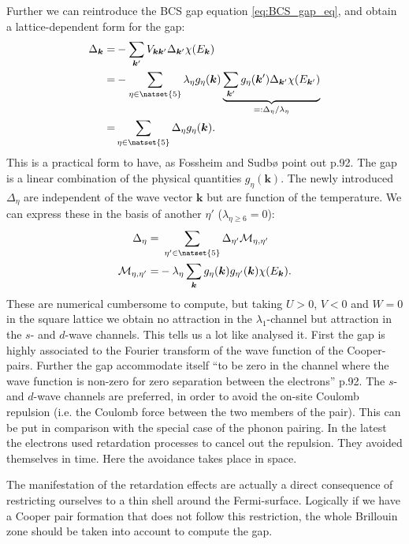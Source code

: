 \documentclass[../main.tex]{subfile}
\begin{document}
Further we can reintroduce the BCS gap equation \ref{eq:BCS_gap_eq}, and obtain a lattice-dependent form for the gap:
\begin{equation}
    \begin{aligned}
    \Delta_{\bm{k}} =& -\sum_{\bm{k}'} V_{\bm{k}\bm{k}'}\Delta_{\bm{k}'}\chi(E_{\bm{k}})\\
    =& -\sum_{\eta\in\natset{5}} \lambda_{\eta} g_{\eta}(\bm{k}) \underbrace{\sum_{\bm{k}'} g_{\eta}(\bm{k}') \Delta_{\bm{k}'}\chi(E_{\bm{k}'})}_{=: \Delta_{\eta}/\lambda_{\eta}}\\
    =& \sum_{\eta\in\natset{5}}\Delta_{\eta} g_{\eta}(\bm{k}).
    \end{aligned}
\end{equation}
This is a practical form to have, as Fossheim and Sudbø \cite{FossheimSudbo2004} point out p.92. The gap is a linear combination of the physical quantities $g_{\eta}(\bm{k})$.
The newly introduced $\Delta_{\eta}$ are independent of the wave vector $\bm{k}$ but are function of the temperature. We can express these in the basis 
of another $\eta'$ ($\lambda_{\eta\ge6} =0$):
\begin{align*}
    \Delta_{\eta} = &~\sum_{\eta' \in \natset{5}} \Delta_{\eta'} \mathcal{M}_{\eta,\eta'}\\
    \mathcal{M}_{\eta,\eta'} =& -\lambda_{\eta}\sum_{\bm{k}} g_{\eta}(\bm{k})g_{\eta'}(\bm{k}) \chi(E_{\bm{k}}).
\end{align*}
These are numerical cumbersome to compute, but taking $U>0$, $V<0$ and $W=0$ in the square lattice we obtain no attraction in the 
$\lambda_1$-channel but attraction in the $s$- and $d$-wave channels. This tells us a lot like \cite{FossheimSudbo2004} analysed it. 
First the gap is highly associated to the Fourier transform of the wave function of the Cooper-pairs.    
Further the gap accommodate itself ``to be zero in the channel where the wave function is non-zero for zero separation between the electrons''\cite{FossheimSudbo2004} p.92.
The $s$- and $d$-wave channels are preferred, in order to avoid the on-site Coulomb repulsion (i.e. the Coulomb force between the two members of the pair).
This can be put in comparison with the special
case of the phonon pairing. In the latest the electrons used retardation processes to cancel out the repulsion. They avoided themselves in time. 
Here the avoidance takes place in space.

The manifestation of the retardation effects are actually a direct consequence of restricting ourselves to a thin shell around the Fermi-surface.
Logically if we have a Cooper pair formation that does not follow this restriction, the whole Brillouin zone should be taken into account to compute the gap.\\
\end{document}
